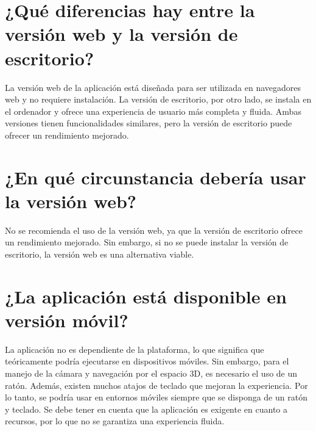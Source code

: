 \section{¿Qué diferencias hay entre la versión web y la versión de escritorio?}

La versión web de la aplicación está diseñada para ser utilizada en navegadores web y no requiere instalación. La versión de escritorio, por otro lado, se instala en el ordenador y ofrece una experiencia de usuario más completa y fluida. Ambas versiones tienen funcionalidades similares, pero la versión de escritorio puede ofrecer un rendimiento mejorado.

\section{¿En qué circunstancia debería usar la versión web?}

No se recomienda el uso de la versión web, ya que la versión de escritorio ofrece un rendimiento mejorado. Sin embargo, si no se puede instalar la versión de escritorio, la versión web es una alternativa viable.

\section{¿La aplicación está disponible en versión móvil?}

La aplicación no es dependiente de la plataforma, lo que significa que teóricamente podría ejecutarse en dispositivos móviles. Sin embargo, para el manejo de la cámara y navegación por el espacio 3D, es necesario el uso de un ratón. Además, existen muchos atajos de teclado que mejoran la experiencia. Por lo tanto, se podría usar en entornos móviles siempre que se disponga de un ratón y teclado. Se debe tener en cuenta que la aplicación es exigente en cuanto a recursos, por lo que no se garantiza una experiencia fluida. 
